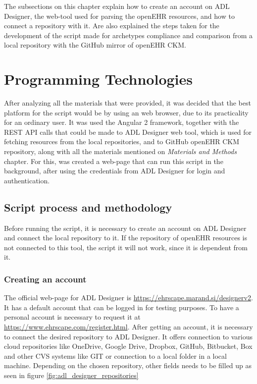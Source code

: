 \documentclass[mim_thesis.tex]{subfiles}
\begin{document}
The subsections on this chapter explain how to create an account on ADL Designer, the web-tool used for parsing the openEHR resources, and how to connect a repository with it. Are also explained the steps taken for the development of the script made for archetypes compliance and comparison from a local repository with the GitHub mirror of openEHR CKM.  

\section{Programming Technologies}
After analyzing all the materials that were provided, it was decided that the best platform for the script would be by using an web browser, due to its practicality for an ordinary user. It was used the Angular 2 framework, together with the REST API calls that could be made to ADL Designer web tool, which is used for fetching resources from the local repositories, and to GitHub openEHR CKM repository, along with all the materials mentioned on \textit{Materials and Methods} chapter. For this, was created a web-page that can run this script in the background, after using the credentials from ADL Designer for login and authentication.

\subsection{Script process and methodology}

Before running the script, it is necessary to create an account on ADL Designer and connect the local repository to it. If the repository of openEHR resources is not connected to this tool, the script it will not work, since it is dependent from it.

\subsubsection{Creating an account}
The official web-page for ADL Designer is \url{https://ehrscape.marand.si/designerv2}. It has a default account that can be logged in for testing purposes. To have a personal account is necessary to request it at \url{https://www.ehrscape.com/register.html}.
After getting an account, it is necessary to connect the desired repository to ADL Designer. It offers connection to various cloud repositories like OneDrive, Google Drive, Dropbox, GitHub, Bitbucket, Box and other CVS systems like GIT or connection to a local folder in a local machine. Depending on the chosen repository, other fields needs to be filled up as seen in figure \ref{fig:adl_designer_repositories}
\end{document}
